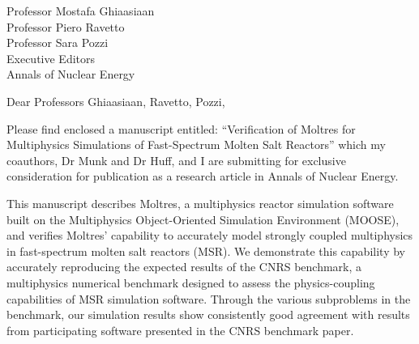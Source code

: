 \documentclass[11pt]{letter} %
\begin{document}


\begin{letter}{Professor Mostafa Ghiaasiaan\\
Professor Piero Ravetto\\
Professor Sara Pozzi\\
Executive Editors\\
Annals of Nuclear Energy}


\address{Sun Myung Park\\
University of Illinois\\
226 Talbot Laboratory\\
MC-234\\
104 S. Wright Street\\
Urbana, IL 61801}




\opening{Dear Professors Ghiaasiaan, Ravetto, Pozzi,}

Please find enclosed a manuscript entitled: ``Verification of Moltres for
Multiphysics Simulations of Fast-Spectrum Molten Salt Reactors'' which my
coauthors, Dr Munk and Dr Huff, and I are submitting for exclusive
consideration for publication as a research article in Annals of Nuclear
Energy.

This manuscript describes Moltres, a multiphysics reactor simulation software
built on the Multiphysics Object-Oriented Simulation Environment (MOOSE), and
verifies Moltres' capability to accurately model strongly coupled multiphysics
in fast-spectrum molten salt reactors (MSR). We demonstrate this capability by
accurately reproducing the expected results of the CNRS benchmark, a
multiphysics numerical benchmark designed to assess the physics-coupling
capabilities of MSR simulation software. Through the various subproblems in the
benchmark, our simulation results show consistently good agreement with
results from participating software presented in the CNRS benchmark
paper.


\end{letter}
\end{document}
